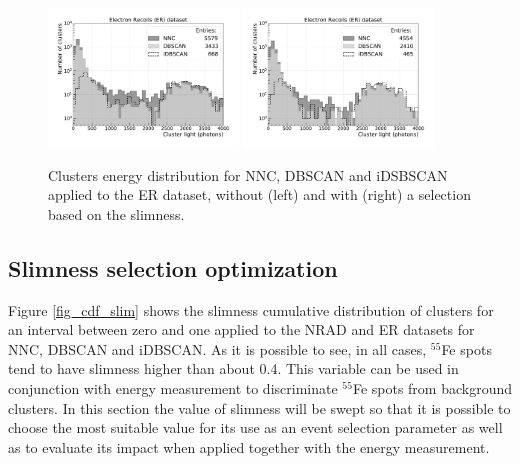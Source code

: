 \documentclass[a4paper,11pt]{article}
\begin{document}
\begin{figure}[ht]
\centering
\includegraphics[width=0.45\textwidth]{LigthYield_Fe_wo.pdf}
\includegraphics[width=0.45\textwidth]{LigthYield_Fe_Slim.pdf}
\caption{Clusters energy distribution for NNC, DBSCAN and iDSBSCAN applied to the ER dataset, without (left) and with (right) a selection based on the slimness.}
\label{fig_compfe}
\end{figure}




\subsection{Slimness selection optimization}
Figure \ref{fig_cdf_slim} shows the slimness cumulative distribution of clusters for an interval between zero and one applied to the NRAD and ER datasets for NNC, DBSCAN and iDBSCAN.
As it is possible to see, in all cases, $^{55}$Fe spots tend to have slimness higher than about 0.4.
This variable can be used in conjunction with energy measurement to discriminate $^{55}$Fe spots from background clusters.
In this section the value of slimness will be swept so that it is possible to choose the most suitable value for its use as an event selection parameter as well as to evaluate its impact when applied together with the energy measurement.
\end{document}
